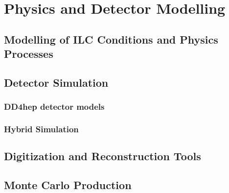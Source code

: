 \chapter{Physics and Detector Modelling}

\section{Modelling of ILC Conditions and Physics Processes}


\section{Detector Simulation}

\subsection{DD4hep detector models}
\subsection{Hybrid Simulation}

\section{Digitization and Reconstruction Tools}

\section{Monte Carlo Production}